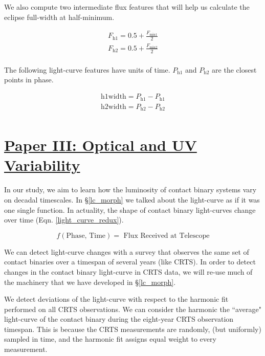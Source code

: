 \documentclass[12pt]{article} %
\numberwithin{equation}{section} %
\begin{document}
We also compute two intermediate flux features that will help us calculate the eclipse full-width at half-minimum. 

\begin{multline}
F_{\text{h1}} = 0.5 + \frac{F_{\text{min1}}}{2} \\
F_{\text{h2}} = 0.5 + \frac{F_{\text{min2}}}{2} \\
\end{multline}

The following light-curve features have units of time. $P_{\text{h1}}$ and $P_{\text{h2}}$ are the closest points in phase.

\begin{multline} \label{time_features}
\text{h1width} = P_{\text{h1}} - P_{\text{h1}} \\
\text{h2width} = P_{\text{h2}} - P_{\text{h2}}  \\
\end{multline}


\cite{o1951so}

\section[Paper III: Optical and UV Variability]{\hyperlink{toc}{Paper III: Optical and UV Variability}} \label{sec: Paper III: Optical and UV Variability}

In our study, we aim to learn how the luminosity of contact binary systems vary on decadal timescales. In \S\ref{lc_morph} we talked about the light-curve as if it was one single function. In actuality, the shape of contact binary light-curves change over time (Eqn. \ref{light_curve_redux}). 

\begin{equation} \label{eqn: light_curve_redux}
f(\text{Phase, Time}) = \text{ Flux Received at Telescope}
\end{equation}

We can detect light-curve changes with a survey that observes the same set of contact binaries over a timespan of several years (like CRTS). In order to detect changes in the contact binary light-curve in CRTS data, we will re-use much of the machinery that we have developed in \S\ref{lc_morph}.

We detect deviations of the light-curve with respect to the harmonic fit performed on all CRTS observations. We can consider the harmonic the ``average" light-curve of the contact binary during the eight-year CRTS observation timespan. This is because the CRTS measurements are randomly, (but uniformly) sampled in time, and the harmonic fit assigns equal weight to every measurement.
\end{document}
